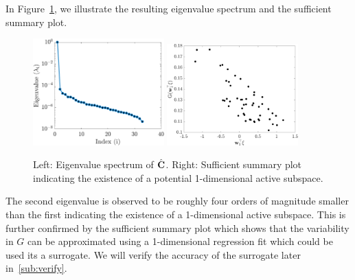 In Figure~\ref{fig:hd}, we illustrate the resulting eigenvalue spectrum and the sufficient summary 
plot.
%
\begin{figure}[htbp]
 \begin{center}
   \includegraphics[width=0.45\textwidth]{./Figures/eig_33D}
   \includegraphics[width=0.45\textwidth]{./Figures/ssp_33D}
\caption{Left: Eigenvalue spectrum of $\hat{\mathbf{{C}}}$. Right: Sufficient summary plot indicating the
existence of a potential 1-dimensional active subspace.} 
\label{fig:hd}
\end{center}
\end{figure}
%
The second eigenvalue is observed to be roughly four orders of magnitude smaller than the first 
indicating the existence of a 1-dimensional active subspace. This is further confirmed by the sufficient
summary plot which shows that the variability in $G$ can be approximated using a 1-dimensional regression
fit which could be used its a surrogate. We will verify the accuracy of the surrogate later in~\ref{sub:verify}.

